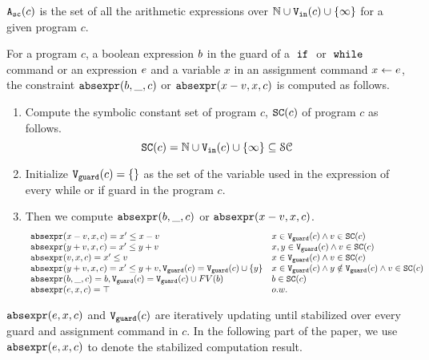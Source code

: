 
\begin{defn}
  \label{def:symbolic_expr}
  ${\mathtt{A_{sc}}}(c)$ is the set of all the arithmetic expressions over $\mathbb{N} \cup {\ensuremath{\mathtt{V_{\mathtt{in}}}}}(c) \cup \{\infty \}$ for a given program $c$.
\end{defn}

\begin{defn}
  \label{def:constraint_compute}
  For a program $c$, a boolean expression $b$ in the guard of a $\;\mathtt{if}\;$ or $\;\mathtt{while}\;$ command
  or an expression $e$ and a variable $x$
  in an assignment command $\mathrel{ x \leftarrow e }$,
  the constraint $\mathtt{abs}{\mathtt{expr}}(b, \_, c )$ or $\mathtt{abs}{\mathtt{expr}}(x - v, x, c)$ is computed as follows.
  \begin{enumerate}
  \item Compute the symbolic constant set of program $c$, $\mathtt{SC}(c)$ of program $c$ as follows.
  \[
    \mathtt{SC}(c) = \mathbb{N} \cup {\ensuremath{\mathtt{V_{\mathtt{in}}}}}(c) \cup \{\infty \} \subseteq \mathcal{SC}
  \]
  \item Initialize 
  $\mathtt{V}_{\mathtt{guard}}(c) = \{\}$ as the set of the variable used in the expression of every while or if guard in the program $c$.
  \item Then we compute  $\mathtt{abs}{\mathtt{expr}}(b, \_, c )$ or $\mathtt{abs}{\mathtt{expr}}(x - v, x, c)$.
  \[
    \begin{array}{ll} 
      \mathtt{abs}{\mathtt{expr}}(x - v, x, c)  = x' \leq x - v  & x \in \mathtt{V}_{\mathtt{guard}}(c)\land v \in \mathtt{SC}(c) \\
      \mathtt{abs}{\mathtt{expr}}(y + v, x, c)  = x' \leq y + v  & x, y \in \mathtt{V}_{\mathtt{guard}}(c)\land v \in \mathtt{SC}(c)\\
      \mathtt{abs}{\mathtt{expr}}(v, x, c)  = x' \leq v  & x \in \mathtt{V}_{\mathtt{guard}}(c)\land v \in \mathtt{SC}(c) \\
      \mathtt{abs}{\mathtt{expr}}(y + v, x, c)  = x' \leq y + v, \mathtt{V}_{\mathtt{guard}}(c) = \mathtt{V}_{\mathtt{guard}}(c) \cup \{y\} 
      & x \in \mathtt{V}_{\mathtt{guard}}(c)\land y \notin \mathtt{V}_{\mathtt{guard}}(c) \land v \in \mathtt{SC}(c)  \\
      \mathtt{abs}{\mathtt{expr}}(b, \_, c) = b, \mathtt{V}_{\mathtt{guard}}(c) = \mathtt{V}_{\mathtt{guard}}(c) \cup FV(b) & b \in \mathtt{SC}(c) \\
      \mathtt{abs}{\mathtt{expr}}(e, x, c) = \top &  {o.w.} \\
    \end{array}
    \]
  \end{enumerate}
   $\mathtt{abs}{\mathtt{expr}}(e, x, c)$ and $\mathtt{V}_{\mathtt{guard}}(c)$ are iteratively updating until stabilized over every guard and assignment command in $c$. In the following part of the paper, we use $\mathtt{abs}{\mathtt{expr}}(e, x, c)$
   to denote the stabilized computation result.
  \end{defn}
